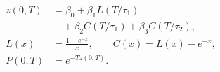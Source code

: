 \documentclass{equation-sheet}
\begin{document}
\begin{equation*}
\begin{aligned}
z(0,T)
  &= \beta_0 + \beta_1 L(T/\tau_1) \\
  &\quad + \beta_2 C(T/\tau_1) + \beta_3 C(T/\tau_2), \\[0.45em]
L(x) &= \frac{1-e^{-x}}{x},
  \qquad C(x)=L(x)-e^{-x}, \\[0.45em]
P(0,T) &= e^{-Tz(0,T)}.
\end{aligned}
\end{equation*}
\end{document}
